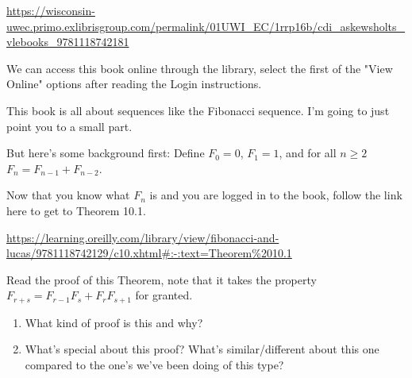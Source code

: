 \documentclass[12pt]{article}
\begin{document}
\begin{enumerate}
	\url{https://wisconsin-uwec.primo.exlibrisgroup.com/permalink/01UWI_EC/1rrp16b/cdi_askewsholts_vlebooks_9781118742181}
	
	We can access this book online through the library, select the first of the "View Online" options after reading the Login instructions.
	
	This book is all about sequences like the Fibonacci sequence. I'm going to just point you to a small part. 
	
	But here's some background first: Define $F_0=0$, $F_1=1$, and for all $n\geq 2$ $F_n=F_{n-1}+F_{n-2}$.
	
	Now that you know what $F_n$ is and you are logged in to the book, follow the link here to get to Theorem 10.1.
	
	\url{https://learning.oreilly.com/library/view/fibonacci-and-lucas/9781118742129/c10.xhtml#:-:text=Theorem%2010.1}
	
	Read the proof of this Theorem, note that it takes the property $F_{r+s}=F_{r-1}F_s+F_rF_{s+1}$ for granted. 
	
	\begin{enumerate}
		\item What kind of proof is this and why? \vfill 
		\item What's special about this proof? What's similar/different about this one compared to the one's we've been doing of this type?\vfill
	\end{enumerate}
	
	\end{enumerate}
		
\end{document}
